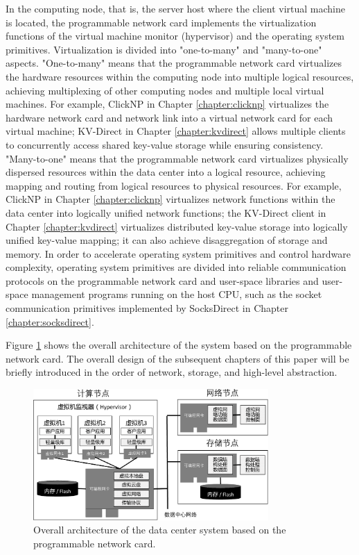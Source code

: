 In the computing node, that is, the server host where the client virtual machine is located, the programmable network card implements the virtualization functions of the virtual machine monitor (hypervisor) and the operating system primitives. Virtualization is divided into "one-to-many" and "many-to-one" aspects. "One-to-many" means that the programmable network card virtualizes the hardware resources within the computing node into multiple logical resources, achieving multiplexing of other computing nodes and multiple local virtual machines. For example, ClickNP in Chapter \ref{chapter:clicknp} virtualizes the hardware network card and network link into a virtual network card for each virtual machine; KV-Direct in Chapter \ref{chapter:kvdirect} allows multiple clients to concurrently access shared key-value storage while ensuring consistency. "Many-to-one" means that the programmable network card virtualizes physically dispersed resources within the data center into a logical resource, achieving mapping and routing from logical resources to physical resources. For example, ClickNP in Chapter \ref{chapter:clicknp} virtualizes network functions within the data center into logically unified network functions; the KV-Direct client in Chapter \ref{chapter:kvdirect} virtualizes distributed key-value storage into logically unified key-value mapping; it can also achieve disaggregation of storage and memory. In order to accelerate operating system primitives and control hardware complexity, operating system primitives are divided into reliable communication protocols on the programmable network card and user-space libraries and user-space management programs running on the host CPU, such as the socket communication primitives implemented by SocksDirect in Chapter \ref{chapter:socksdirect}.

Figure \ref{arch:fig:accel-arch} shows the overall architecture of the system based on the programmable network card. The overall design of the subsequent chapters of this paper will be briefly introduced in the order of network, storage, and high-level abstraction.

\begin{figure}[htbp]
	\centering
	\includegraphics[width=0.8\textwidth]{figures/accel_arch.pdf}
	\caption{Overall architecture of the data center system based on the programmable network card.}
	\label{arch:fig:accel-arch}
\end{figure}

